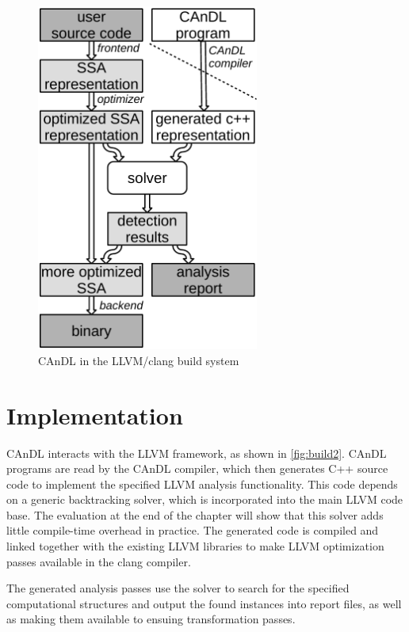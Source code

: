 \begin{figure}[t]
\centering
\includegraphics[width=0.65\textwidth]{figures/compilerFlow2.pdf}
\caption{CAnDL in the LLVM/clang build system}
\label{fig:build2}
\end{figure}

\section{Implementation}

    CAnDL interacts with the LLVM framework, as shown in \autoref{fig:build2}.
    CAnDL programs are read by the CAnDL compiler, which then generates C++
    source code to implement the specified LLVM analysis functionality.
    This code depends on a generic backtracking solver, which is incorporated
    into the main LLVM code base. 
    The evaluation at the end of the chapter will show that this solver adds
    little compile-time overhead in practice.
    The generated code is compiled and linked together with the existing LLVM
    libraries to make LLVM optimization passes available in the clang compiler.

    The generated analysis passes use the solver to search for the specified
    computational structures and output the found instances into report files,
    as well as making them available to ensuing transformation passes.

